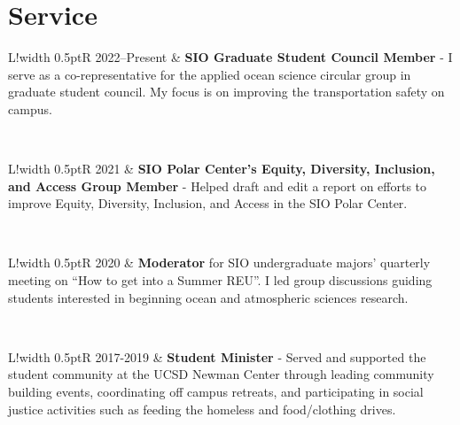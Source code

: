 \documentclass[10pt]{article}
\newcommand\VRule{\color{lightgray}\vrule width 0.5pt}
\begin{document}
\section*{Service}
\vspace{.3cm}
\begin{tabular}{L!{\VRule}R}
2022--Present & \textbf{SIO Graduate Student Council Member} - I serve as a co-representative for the applied ocean science circular group in graduate student council. My focus is on improving the transportation safety on campus.\\[5pt]
\end{tabular} 
\\[10pt]
\begin{tabular}{L!{\VRule}R}
2021 & \textbf{SIO Polar Center's Equity, Diversity, Inclusion, and Access Group Member} - Helped draft and edit a report on efforts to improve Equity, Diversity, Inclusion, and Access in the SIO Polar Center. \\[5pt]
\end{tabular} 
\\[10pt]
\begin{tabular}{L!{\VRule}R}
2020 & \textbf{Moderator} for SIO undergraduate majors’ quarterly meeting on ``How to get into a Summer REU''. I led group discussions guiding students interested in beginning ocean and atmospheric sciences research. 
\end{tabular}
\\[10pt]
\begin{tabular}{L!{\VRule}R}
2017-2019 & \textbf{Student Minister} - Served and supported the student community at the UCSD Newman Center through leading community building events, coordinating off campus retreats, and participating in social justice activities such as feeding the homeless and food/clothing drives.  \\[5pt]
\end{tabular} 

\end{document}
